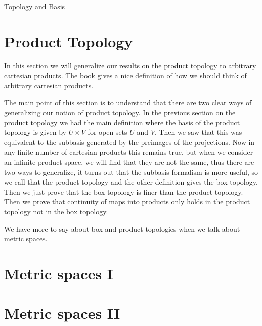\begin{chapter}{Topology and Basis}
   \section{Product Topology}
   In this section we will generalize our results on the product topology to arbitrary cartesian products. 
   The book gives a nice definition of how we should think of arbitrary cartesian products. 

   The main point of this section is to understand that there are two clear ways of generalizing our notion of product topology. 
   In the previous section on the product topology we had the main definition where the basis of the product topology 
   is given by $U \times V$ for open sets $U$ and $V$. Then we saw that this was equivalent to the subbasis generated by 
   the preimages of the projections. Now in any finite number of cartesian products this remains true, but when we consider 
   an infinite product space, we will find that they are not the same, thus there are two ways to generalize, 
   it turns out that the subbasis formalism is more useful, so we call that the product topology and the other definition gives 
   the box topology. Then we just prove that the box topology is finer than the product topology. Then we prove that 
   continuity of maps into products only holds in the product topology not in the box topology. 
   
   We have more to say about box and product topologies when we talk about metric spaces. 

   \newpage
   
   \newpage 

   \section{Metric spaces I }

   \section{Metric spaces II}
    
\end{chapter}
